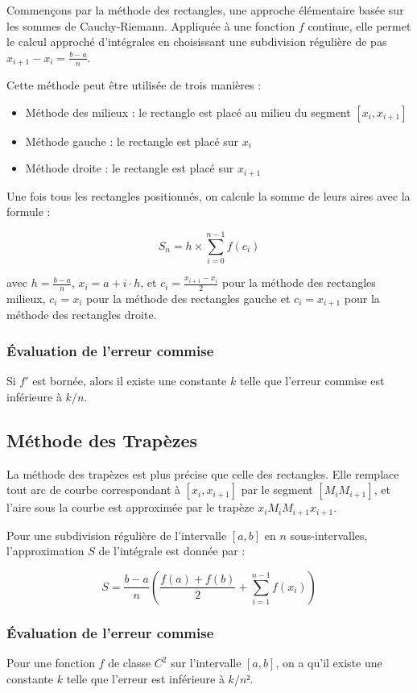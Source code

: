 \documentclass{article}
\begin{document}
Commençons par la méthode des rectangles, une approche élémentaire basée sur les sommes de Cauchy‑Riemann. Appliquée à une fonction $f$ continue, elle permet le calcul approché d'intégrales en choisissant une subdivision régulière de pas $x_{i+1} - x_i = \frac{b-a}{n}$.

Cette méthode peut être utilisée de trois manières :
\begin{itemize}
 \item Méthode des milieux : le rectangle est placé au milieu du segment $[x_i, x_{i+1}]$
 \item Méthode gauche : le rectangle est placé sur $x_i$
 \item Méthode droite : le rectangle est placé sur $x_{i+1}$
\end{itemize}
Une fois tous les rectangles positionnés, on calcule la somme de leurs aires avec la formule :

$$S_n = h \times \sum_{i=0}^{n-1} f(c_i)$$

avec $h = \frac{b-a}{n}$, $x_i = a + i \cdot h$, et $c_i = \frac{x_{i+1} - x_i}{2}$ pour la méthode des rectangles milieux, $c_i = x_i$ pour la méthode des rectangles gauche et $c_i = x_{i+1}$ pour la méthode des rectangles droite.
\subsubsection*{Évaluation de l'erreur commise}

Si $f'$ est bornée, alors il existe une constante $k$ telle que l'erreur commise est inférieure à $k/n$.
\subsection*{Méthode des Trapèzes}
La méthode des trapèzes est plus précise que celle des rectangles. Elle remplace tout arc de courbe correspondant à $[x_i, x_{i+1}]$ par le segment $[M_i M_{i+1}]$, et l'aire sous la courbe est approximée par le trapèze $x_i M_i M_{i+1} x_{i+1}$.

Pour une subdivision régulière de l'intervalle $[a,b]$ en $n$ sous-intervalles, l'approximation $S$ de l'intégrale est donnée par :

$$S = \frac{b-a}{n}\left(\frac{f(a) + f(b)}{2} + \sum_{i=1}^{n-1} f(x_i)\right)$$
\subsubsection*{Évaluation de l'erreur commise}
Pour une fonction $f$ de classe $C^2$ sur l'intervalle $[a,b]$, on a qu'il existe une constante $k$ telle que l'erreur est inférieure à $k/n²$.
\end{document}
